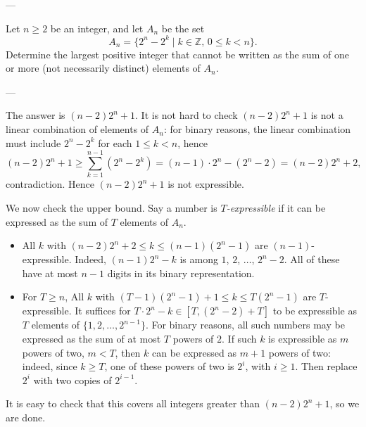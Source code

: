 
---

Let $n\ge 2$ be an integer, and let $A_n$ be the set \[A_n=\{2^n-2^k\mid k\in\mathbb Z,\, 0\le k<n\}.\]
Determine the largest positive integer that cannot be written as the sum of one or more (not necessarily distinct) elements of $A_n$.

---

The answer is $(n-2)2^n+1$. It is not hard to check $(n-2)2^n+1$ is not a linear combination of elements of $A_n$: for binary reasons, the linear combination must include $2^n-2^k$ for each $1\le k<n$, hence \[(n-2)2^n+1\ge\sum_{k=1}^{n-1}\left(2^n-2^k\right)=(n-1)\cdot2^n-\left(2^n-2\right)=(n-2)2^n+2,\]
contradiction. Hence $(n-2)2^n+1$ is not expressible.

We now check the upper bound. Say a number is \emph{$T$-expressible} if it can be expressed as the sum of $T$ elements of $A_n$.
\begin{itemize}
    \item All $k$ with $(n-2)2^n+2\le k\le(n-1)(2^n-1)$ are $(n-1)$-expressible. Indeed, $(n-1)2^n-k$ is among $1$, $2$, $\ldots$, $2^n-2$. All of these have at most $n-1$ digits in its binary representation.
    \item For $T\ge n$, All $k$ with $(T-1)(2^n-1)+1\le k\le T(2^n-1)$ are $T$-expressible. It suffices for $T\cdot2^n-k\in[T,(2^n-2)+T]$ to be expressible as $T$ elements of $\{1,2,\ldots,2^{n-1}\}$. For binary reasons, all such numbers may be expressed as the sum of at most $T$ powers of $2$. If such $k$ is expressible as $m$ powers of two, $m<T$, then $k$ can be expressed as $m+1$ powers of two: indeed, since $k\ge T$, one of these powers of two is $2^i$, with $i\ge1$. Then replace $2^i$ with two copies of $2^{i-1}$.
\end{itemize}
It is easy to check that this covers all integers greater than $(n-2)2^n+1$, so we are done.

